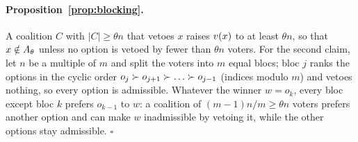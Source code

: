 \paragraph{Proposition~\ref{prop:blocking}.}
A coalition $C$ with $|C| \ge \theta n$ that vetoes $x$ raises $v(x)$ to at least $\theta n$, so that
$x \notin A_\theta$ unless no option is vetoed by fewer than $\theta n$ voters. For the second claim, let $n$
be a multiple of $m$ and split the voters into $m$ equal blocs; bloc $j$ ranks the options in the cyclic
order $o_j \pref o_{j+1} \pref \dots \pref o_{j-1}$ (indices modulo $m$) and vetoes nothing, so every
option is admissible. Whatever the winner $w = o_k$, every bloc except bloc $k$ prefers $o_{k-1}$ to $w$:
a coalition of $(m-1)n/m \ge \theta n$ voters prefers another option and can make $w$ inadmissible by
vetoing it, while the other options stay admissible. \hfill$\square$
